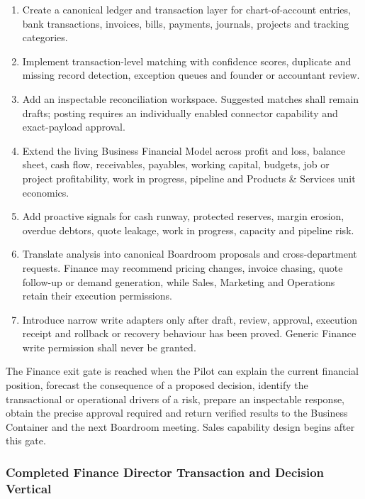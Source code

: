 \begin{enumerate}
  \item Create a canonical ledger and transaction layer for chart-of-account entries, bank
        transactions, invoices, bills, payments, journals, projects and tracking categories.
  \item Implement transaction-level matching with confidence scores, duplicate and missing
        record detection, exception queues and founder or accountant review.
  \item Add an inspectable reconciliation workspace.  Suggested matches shall remain drafts;
        posting requires an individually enabled connector capability and exact-payload approval.
  \item Extend the living Business Financial Model across profit and loss, balance sheet, cash
        flow, receivables, payables, working capital, budgets, job or project profitability,
        work in progress, pipeline and Products \& Services unit economics.
  \item Add proactive signals for cash runway, protected reserves, margin erosion, overdue
        debtors, quote leakage, work in progress, capacity and pipeline risk.
  \item Translate analysis into canonical Boardroom proposals and cross-department requests.
        Finance may recommend pricing changes, invoice chasing, quote follow-up or demand
        generation, while Sales, Marketing and Operations retain their execution permissions.
  \item Introduce narrow write adapters only after draft, review, approval, execution receipt
        and rollback or recovery behaviour has been proved.  Generic Finance write permission
        shall never be granted.
\end{enumerate}

The Finance exit gate is reached when the Pilot can explain the current financial position,
forecast the consequence of a proposed decision, identify the transactional or operational
drivers of a risk, prepare an inspectable response, obtain the precise approval required and
return verified results to the Business Container and the next Boardroom meeting.  Sales
capability design begins after this gate.

\subsubsection{Completed Finance Director Transaction and Decision Vertical}

